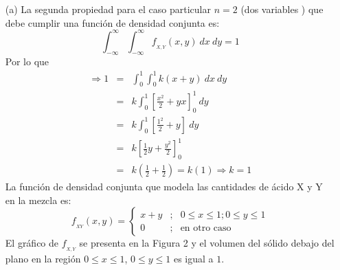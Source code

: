 \documentclass[base=hide,12pt]{elegantbook}
\begin{document}
%		
\begin{itemize}
	\item[(a)] La segunda propiedad para el caso particular $n=2$ (dos variables ) que debe cumplir una función de densidad conjunta es:
	$$\int_{-\infty}^{\infty}\int_{-\infty}^{\infty}f_{_{X,Y}}(x,y)\:dx\:dy=1$$
	Por lo que
	\begin{eqnarray*}
		\Rightarrow 1&=&\int_{0}^{1}\int_{0}^{1}k(x+y)\:dx\:dy\\
		&=&k\int_{0}^{1}\left[\frac{x^2}{2}+yx\right]_{0}^{1}\:dy\\
		&=&k\int_{0}^{1}\left[\frac{1^2}{2}+y\right]\:dy\\
		&=&k\left[\frac{1}{2}y+\frac{y^2}{2}\right]_{0}^{1}\\
		&=&k\left(\frac{1}{2}+\frac{1}{2}\right)=k(1)\Rightarrow k=1
	\end{eqnarray*}
	La función de densidad conjunta que modela las cantidades  de  ácido X y Y  en la mezcla es:
	\begin{equation*}
		f_{_{XY}}(x,y)=\left\lbrace
		\begin{array}{ccl}
			x + y&;& 0 \leq x \leq 1 ; 0 \leq y \leq 1\\
			0 &;&\mbox{en otro caso}
		\end{array}
		\right.
	\end{equation*}
	El gráfico de $f_{_{X,Y}}$ se presenta en la Figura 2 y el volumen del sólido debajo del plano en la región $0\leq x\leq 1$, $0\leq y\leq 1$ es igual a $1$.


\end{itemize}
\end{document}

